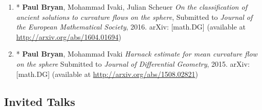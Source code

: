 \documentclass[12pt]{amsart}
\begin{document}
\begin{enumerate}[resume]
\item * \textbf{Paul Bryan}, Mohammad Ivaki, Julian Scheuer \emph{On the classification of ancient solutions to curvature flows on the sphere}, Submitted to \emph{Journal of the European Mathematical Society}, 2016. arXiv: [math.DG] (available at \url{http://arxiv.org/abs/1604.01694})
\item * \textbf{Paul Bryan}, Mohammad Ivaki \emph{Harnack estimate for mean curvature flow on the sphere} Submitted to \emph{Journal of Differential Geometry}, 2015. arXiv: [math.DG] (available at \url{http://arxiv.org/abs/1508.02821})
\end{enumerate}

\subsection*{Invited Talks}
\label{sec-2-2}
\end{document}
